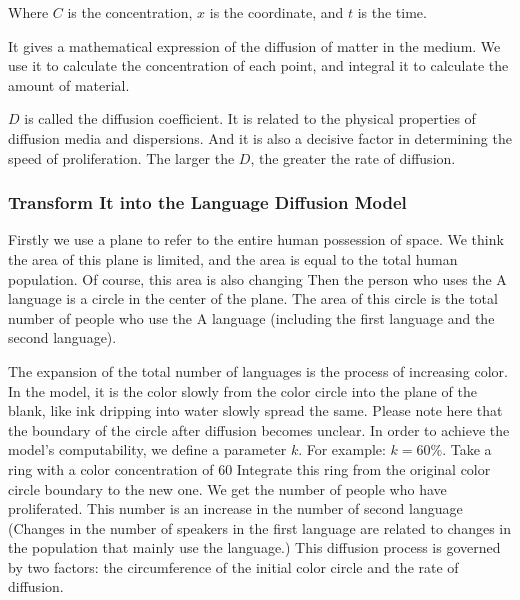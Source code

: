 \documentclass{mcmthesis}
\begin{document}
    Where $C$ is the concentration, $x$ is the coordinate, and $t$ is the time.

    It gives a mathematical expression of the diffusion of matter in the medium.
    We use it to calculate the concentration of each point,
    and integral it to calculate the amount of material.

    $D$ is called the diffusion coefficient.
    It is related to the physical properties of diffusion media and dispersions.
    And it is also a decisive factor in determining the speed of proliferation.
    The larger the $D$, the greater the rate of diffusion.
    \subsubsection{Transform It into the Language Diffusion Model}%

    Firstly we use a plane to refer to the entire human possession of space.
    We think the area of this plane is limited, and the area is equal to the total human population.
    Of course, this area is also changing
    Then the person who uses the A language is a circle in the center of the plane.
    The area of this circle is the total number of people who use the A language (including the first language and the second language).

    The expansion of the total number of languages is the process of increasing color.
    In the model, it is the color slowly from the color circle into the plane of the blank, like ink dripping into water slowly spread the same.
    Please note here that the boundary of the circle after diffusion becomes unclear.
    In order to achieve the model's computability, we define a parameter $k$.
    For example: $k=60\%$.
    Take a ring with a color concentration of 60%
    Integrate this ring from the original color circle boundary to the new one.
    We get the number of people who have proliferated.
    This number is an increase in the number of second language
    (Changes in the number of speakers in the first language are related to changes in the population that mainly use the language.)
    This diffusion process is governed by two factors: the circumference of the initial color circle and the rate of diffusion.
\end{document}
